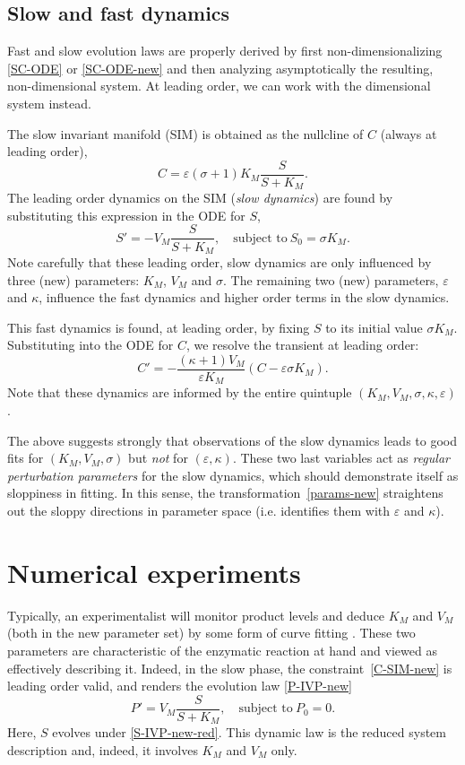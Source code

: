 \documentclass{article}
\newcommand{\eps}{\varepsilon}
\newcommand{\be}{\begin{equation}}
\newcommand{\ee}{\end{equation}}
\begin{document}
\subsection{Slow and fast dynamics}
%
Fast and slow evolution laws are properly derived
by first non-dimensionalizing \eqref{SC-ODE} or \eqref{SC-ODE-new}
and then analyzing asymptotically the resulting, non-dimensional system.
At leading order, we can work with the dimensional system instead.

The slow invariant manifold (SIM) is obtained
as the nullcline of $C$ (always at leading order),
%
\be
 C = \eps (\sigma + 1) K_M \frac{S}{S + K_M} .
\label{C-SIM-new}
\ee
%
The leading order dynamics on the SIM (\textit{slow dynamics})
are found by substituting this expression in the ODE for $S$,
%
\be
 S' = -V_M \frac{S}{S + K_M} ,
\quad\mbox{subject to}\
 S_0 = \sigma K_M .
\label{S-IVP-new-red}
\ee
%
Note carefully that these leading order, slow dynamics
are only influenced by three (new) parameters:
$K_M$, $V_M$ and $\sigma$.
The remaining two (new) parameters,
$\eps$ and $\kappa$,
influence the fast dynamics
and higher order terms in the slow dynamics.

This fast dynamics is found, at leading order,
by fixing $S$ to its initial value $\sigma K_M$.
Substituting into the ODE for $C$,
we resolve the transient at leading order:
%
\[
 C'
=
 -\frac{(\kappa+1)V_M}{\eps K_M} (C - \eps\sigma K_M) .
\]
%
Note that these dynamics are informed by the entire quintuple
$(K_M,V_M,\sigma,\kappa,\eps)$.

The above suggests strongly that observations of the slow dynamics
leads to good fits for $(K_M,V_M,\sigma)$
but \emph{not} for $(\eps,\kappa)$.
These two last variables act as
\emph{regular perturbation parameters} for the slow dynamics,
which should demonstrate itself as sloppiness in fitting.
In this sense, the transformation~\eqref{params-new}
straightens out the sloppy directions in parameter space
(i.e. identifies them with $\eps$ and $\kappa$).

\section{Numerical experiments}
%
Typically, an experimentalist will monitor product levels
and deduce $K_M$ and $V_M$ (both in the new parameter set)
by some form of curve fitting \cite{JG11,LB34,MM13}.
These two parameters are characteristic
of the enzymatic reaction at hand
and viewed as effectively describing it.
Indeed, in the slow phase,
the constraint~\eqref{C-SIM-new} is leading order valid,
and renders the evolution law \eqref{P-IVP-new}
%
\be
 P' = V_M \frac{S}{S + K_M} ,
\quad\mbox{subject to}\
 P_0 = 0 .
\label{P-ODE-new-red}
\ee
%
Here, $S$ evolves under \eqref{S-IVP-new-red}.
This dynamic law is the reduced system description and,
indeed, it involves $K_M$ and $V_M$ only.
\end{document}
